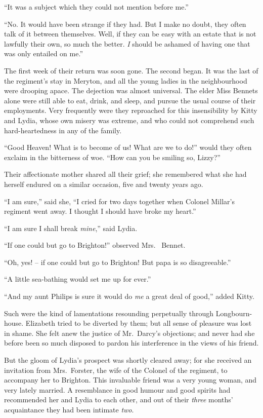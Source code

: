 “It was a subject which they could not mention before
me.”

“No. It would have been strange if they had. But
I make no doubt, they often talk of it between themselves.
Well, if they can be easy with an estate that is not lawfully
their own, so much the better. \textit{I} should be ashamed of
having one that was only entailed on me.”


The first week of their return was soon gone. The
second began. It was the last of the regiment’s stay in
Meryton, and all the young ladies in the neighbourhood
were drooping apace. The dejection was almost universal.
The elder Miss Bennets alone were still able to eat, drink,
and sleep, and pursue the usual course of their employments.
Very frequently were they reproached for this
insensibility by Kitty and Lydia, whose own misery was
extreme, and who could not comprehend such hard-heartedness
in any of the family.

“Good Heaven! What is to become of us! What are
we to do!” would they often exclaim in the bitterness
of woe. “How can you be smiling so, Lizzy?”

Their affectionate mother shared all their grief; she
remembered what she had herself endured on a similar
occasion, five and twenty years ago.

“I am sure,” said she, “I cried for two days together
when Colonel Millar’s regiment went away. I thought
I should have broke my heart.”

“I am sure I shall break \textit{mine},” said Lydia.

“If one could but go to Brighton!” observed Mrs.\ %
Bennet.

“Oh, yes! -- if one could but go to Brighton! But papa
is so disagreeable.”

“A little sea-bathing would set me up for ever.”

“And my aunt Philips is sure it would do \textit{me} a great
deal of good,” added Kitty.

Such were the kind of lamentations resounding perpetually
through Longbourn-house. Elizabeth tried to
be diverted by them; but all sense of pleasure was lost
in shame. She felt anew the justice of Mr.\ Darcy’s objections;
and never had she before been so much disposed
to pardon his interference in the views of his friend.

But the gloom of Lydia’s prospect was shortly cleared
away; for she received an invitation from Mrs.\ Forster,
the wife of the Colonel of the regiment, to accompany her
to Brighton. This invaluable friend was a very young
woman, and very lately married. A resemblance in good
humour and good spirits had recommended her and Lydia
to each other, and out of their \textit{three} months’ acquaintance
they had been intimate \textit{two}.

